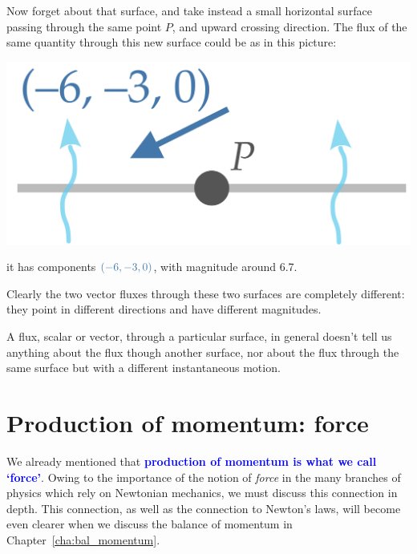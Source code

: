 \documentclass[a4paper,12pt,%
onecolumn,oneside,%
british%
]{memoir}
\providecommand{\href}[2]{#2}
\renewcommand*{\|}[1][]{\nonscript\:#1\vert\nonscript\:\mathopen{}}
\newcommand*{\sect}{\S}%
\newcommand*{\chap}{Chapter}%
\newcommand*{\furl}[2]{\href{#1}{#2}\pagenote{\url{#1}}}
\renewcommand*{\autoref}[2]{\sidepar{\vspace{-1ex}\footnotesize{\color{blue}\faIcon{%
angle-right%
}\enskip\sect~\ref{#1} page~\pageref{#1}}}\textcolor{blue}{#2}}
\begin{document}
Now forget about that surface, and take instead a small horizontal surface passing through the same point $P$, and upward crossing direction. The flux of the same quantity through this new surface could be as in this picture:
\begin{center}
  \includegraphics[align=c,scale=0.08]{images/skewfluxPy.pdf}
\end{center}
it has components $\mathcolor{blue}{(-6,-3,0)}$, with magnitude around \num{6.7}.

Clearly the two vector fluxes through these two surfaces are completely different: they point in different directions and have different magnitudes.

\begin{warning}
  A flux, scalar or vector, through a particular surface, in general doesn't tell us anything about the flux though another surface, nor about the flux through the same surface but with a different instantaneous motion.
\end{warning}


\section{Production of momentum: force}
\label{sec:force_is_production}

We already mentioned that \autoref{sec:intro_momentum}{\textbf{production of momentum is what we call \enquote*{force}}}. Owing to the importance of the notion of \emph{force} in the many branches of physics which rely on Newtonian mechanics, we must discuss this connection in depth. This connection, as well as the connection to Newton's laws, will become even clearer when we discuss the balance of momentum in \chap~\ref{cha:bal_momentum}.
\end{document}
